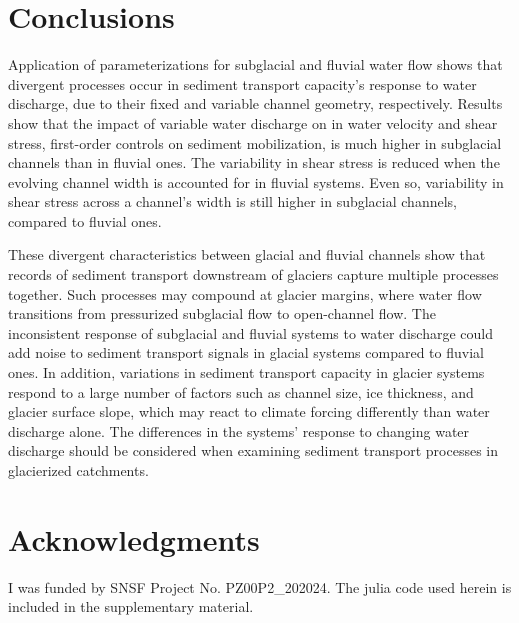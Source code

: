 \documentclass[11pt]{article}
\begin{document}
\begin{spacing}{1}
        
          
          \section{Conclusions}
          
            Application of parameterizations for subglacial and fluvial water flow shows that divergent processes occur in sediment transport capacity's response to water discharge, due to their fixed and variable channel geometry, respectively.
            Results show that the impact of variable water discharge on in water velocity and shear stress, first-order controls on sediment mobilization, is much higher in subglacial channels than in fluvial ones.
              The variability in shear stress is reduced when the evolving channel width is accounted for in fluvial systems.
    Even so, variability in shear stress across a channel's width is still higher in subglacial channels, compared to fluvial ones.
              
    These divergent characteristics between glacial and fluvial channels show that records of sediment transport downstream of glaciers capture multiple processes together.
    Such processes may compound at glacier margins, where water flow transitions from pressurized subglacial flow to open-channel flow.
      The inconsistent response of subglacial and fluvial systems to water discharge could add  noise to sediment transport signals in glacial systems compared to fluvial ones.
        In addition, variations in sediment transport capacity in glacier systems respond to a large number of factors such as channel size, ice thickness, and glacier surface slope, which may react to climate forcing differently than water discharge alone. 
      The differences in the systems' response to changing water discharge should be considered when examining sediment transport processes in glacierized catchments.
          
          \section{Acknowledgments}
        
          I was funded by SNSF Project No. PZ00P2\_202024.
          The julia code used herein is included in the supplementary material.
        
          
        \end{spacing}
        
        
        
        
\end{document}
